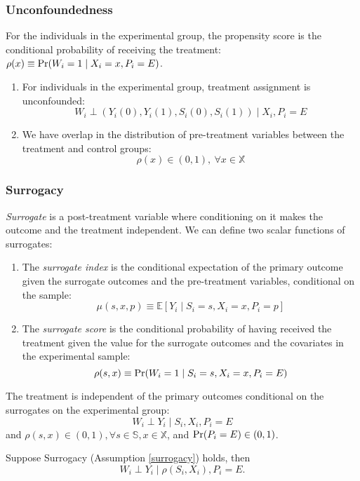 \subsubsection*{Unconfoundedness}
For the individuals in the experimental group, the propensity score is the conditional probability of receiving the treatment: $\rho(x)\equiv \textnormal{Pr}(W_i=1\mid X_i=x,P_i=E)$.
\begin{assumption}\label{unconfounded}
\begin{enumerate}
    \item For individuals in the experimental group, treatment assignment is unconfounded: $$W_i\perp (Y_i(0), Y_i(1), S_i(0), S_i(1))\mid X_i,P_i=E$$
    \item We have overlap in the distribution of pre-treatment variables between the treatment and control groups: $$\rho(x)\in (0,1),\ \forall x\in \mathbb{X}$$
\end{enumerate}
\end{assumption}

\subsubsection*{Surrogacy}
\textit{Surrogate} is a post-treatment variable where conditioning on it makes the outcome and the treatment independent. We can define two scalar functions of surrogates:
\begin{definition}
    \begin{enumerate}
        \item The \textit{surrogate index} is the conditional expectation of the primary outcome given the surrogate outcomes and the pre-treatment variables, conditional on the sample: $$\mu(s,x,p)\equiv \mathbb{E}[Y_i\mid S_i=s,X_i=x,P_i=p]$$
        \item The \textit{surrogate score} is the conditional probability of having received the treatment given the value for the surrogate outcomes and the covariates in the experimental sample: $$\rho(s,x)\equiv \textnormal{Pr}(W_i=1\mid S_i=s,X_i=x,P_i=E)$$
    \end{enumerate}
\end{definition}
\begin{assumption}[Surrogacy]\label{surrogacy}
    The treatment is independent of the primary outcomes conditional on the surrogates on the experimental group: $$W_i\perp Y_i\mid S_i, X_i,P_i=E$$
    and $\rho(s,x)\in(0,1),\forall s\in \mathbb{S},x\in \mathbb{X}$, and $\textnormal{Pr}(P_i=E)\in (0,1)$.
\end{assumption}
\begin{proposition}
    Suppose Surrogacy (Assumption \ref{surrogacy}) holds, then $$W_i\perp Y_i\mid \rho(S_i,X_i), P_i=E.$$
\end{proposition}


